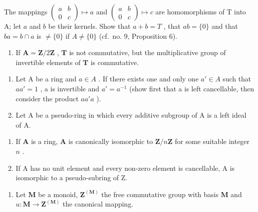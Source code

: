 The mappings \(\begin{pmatrix} a & b \\ 0 & c \end{pmatrix} \mapsto a\) and \(\begin{pmatrix} a & b \\ 0 & c \end{pmatrix} \mapsto c\) are homomorphisms of T into A; let \(a\) and \(b\) be their kernels. Show that \(a + b = T\) , that \(ab = \{0\}\) and that \(ba = b \cap a\) is \(\neq \{0\}\) if \(A \neq \{0\}\) (cf.~no. 9, Proposition 6).

\begin{enumerate}
\def\labelenumi{(\alph{enumi})}
\setcounter{enumi}{3}
\tightlist
\item
  If \(\mathbf{A} = \mathbf{Z} / 2\mathbf{Z}\) , \(\mathbf{T}\) is not commutative, but the multiplicative group of invertible elements of \(\mathbf{T}\) is commutative.
\end{enumerate}

\begin{enumerate}
\def\labelenumi{\arabic{enumi}.}
\setcounter{enumi}{2}
\item
  Let A be a ring and \(a \in A\) . If there exists one and only one \(a' \in A\) such that \(aa' = 1\) , a is invertible and \(a' = a^{-1}\) (show first that a is left cancellable, then consider the product \(aa'a\) ).
\item
  Let A be a pseudo-ring in which every additive subgroup of A is a left ideal of A.
\end{enumerate}

\begin{enumerate}
\def\labelenumi{(\alph{enumi})}
\item
  If \(\mathbf{A}\) is a ring, \(\mathbf{A}\) is canonically isomorphic to \(\mathbf{Z} / n\mathbf{Z}\) for some suitable integer \(n\) .
\item
  If A has no unit element and every non-zero element is cancellable, A is isomorphic to a pseudo-subring of Z.
\end{enumerate}

\begin{enumerate}
\def\labelenumi{\arabic{enumi}.}
\setcounter{enumi}{4}
\tightlist
\item
  Let \(\mathbf{M}\) be a monoid, \(\mathbf{Z}^{(\mathbf{M})}\) the free commutative group with basis \(\mathbf{M}\) and \(u\colon \mathbf{M}\to \mathbf{Z}^{(\mathbf{M})}\) the canonical mapping.
\end{enumerate}

